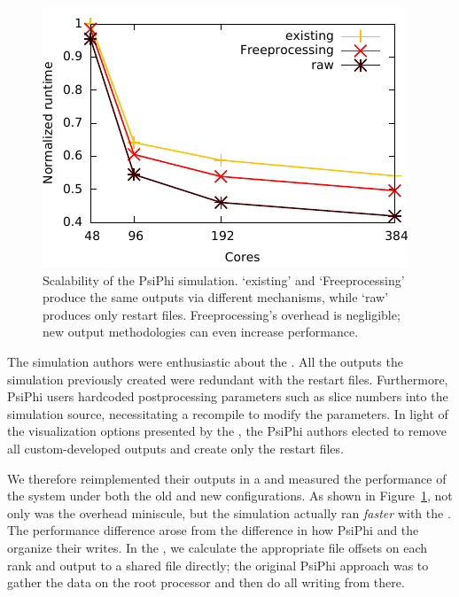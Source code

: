 
\begin{figure}
  \centering
  \includegraphics{images/fp/scaling.pdf}

  \caption{Scalability of the PsiPhi simulation. `existing' and
  `Freeprocessing' produce the same outputs via different mechanisms,
  while `raw' produces only restart files.  Freeprocessing's
  overhead is negligible; new output methodologies can even increase
  performance.}

  \label{fig:scaling}
\end{figure}

The simulation authors were enthusiastic about the
\freeprocessor{}.  All the outputs the simulation previously created
were redundant with the restart files.  Furthermore, PsiPhi users
hardcoded postprocessing parameters such as slice numbers into the
simulation source, necessitating a recompile to modify the parameters.
In light of the visualization
options presented by the \freeprocessor{}, the PsiPhi authors elected
to remove
all custom-developed \insitu{} outputs and create only the restart
files.

We therefore reimplemented their outputs in a \freeprocessor{} and
measured the performance of the system under both the old and new
configurations.  As
shown in Figure~\ref{fig:scaling}, not only was the overhead miniscule,
but the
simulation actually ran \emph{faster} with the \freeprocessor{}.  The
performance difference arose from the difference in how PsiPhi and
the \freeprocessor{} organize their writes.  In the
\freeprocessor{}, we calculate the appropriate file offsets on each
rank and output to a shared file directly; the original PsiPhi approach
was to gather the data on the root processor and then do all writing
from there.

